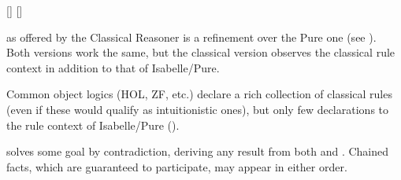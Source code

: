 \begin{isabellebody}
\begin{isamarkuptext}
  \begin{railoutput}
[]
\rail@bar
{}
[]
\rail@endbar
\rail@end
\end{railoutput}


  \begin{description}

  \item \hyperlink{method.rule}{\mbox{}} as offered by the Classical Reasoner is a
  refinement over the Pure one (see ).  Both
  versions work the same, but the classical version observes the
  classical rule context in addition to that of Isabelle/Pure.

  Common object logics (HOL, ZF, etc.) declare a rich collection of
  classical rules (even if these would qualify as intuitionistic
  ones), but only few declarations to the rule context of
  Isabelle/Pure ().

  \item \hyperlink{method.contradiction}{\mbox{}} solves some goal by contradiction,
  deriving any result from both  and .  Chained
  facts, which are guaranteed to participate, may appear in either
  order.


\end{description}
\end{isamarkuptext}
\end{isabellebody}
